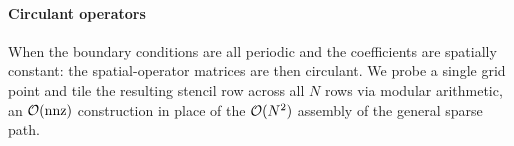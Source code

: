 
\paragraph*{Circulant operators} When the boundary
conditions are all periodic and the
coefficients are spatially constant: the spatial-operator matrices
are then circulant. We probe a single grid point and tile
the resulting stencil row across all $N$ rows via modular arithmetic,
an $\mathcal{O}(\mathrm{nnz})$ construction in place of the $\mathcal{O}(N^2)$ assembly
of the general sparse path.




